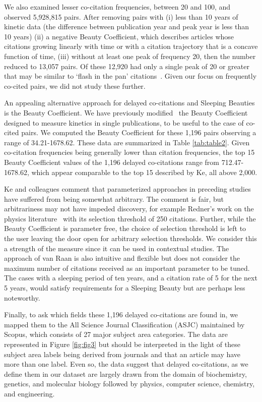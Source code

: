 \documentclass[11pt, oneside]{article}   	%
\begin{document}
We also examined lesser co-citation frequencies, between 20 and 100, and observed 5,928,815 pairs. After removing pairs with (i) less than 10 years of kinetic data (the difference between publication year and peak year is less than 10 years) (ii) a negative Beauty Coefficient, which describes articles whose citations growing linearly with time or with a citation trajectory that is a concave function of time, (iii) without at least one peak of frequency 20, then the number reduced to 13,057 pairs. Of these 12,920 had only a single peak of 20 or greater that may be similar to `flash in the pan' citations~\citep{Li2013CitationCO,ye_bornmann_2018}. Given our focus on frequently co-cited pairs, we did not study these further.

An appealing alternative approach for delayed co-citations and Sleeping Beauties is the Beauty Coefficient. We have previously modified~\citep{devarakonda_2020}  the Beauty Coefficient~\citep{Ke2015} designed to measure kinetics in single publications, to be useful to the case of co-cited pairs. We computed the Beauty Coefficient for these 1,196 pairs observing a range of 34.21-1678.62. These data are summarized in Table \ref{tab:table2}.  Given co-citation frequencies being generally lower than citation frequencies, the top 15 Beauty Coefficient values of the 1,196 delayed co-citations range from 712.47-1678.62, which appear comparable to the top 15 described by Ke, all above 2,000.

Ke and colleagues comment that parameterized approaches in preceding studies have suffered from being somewhat arbitrary. The comment is fair, but arbitrariness may not have impeded discovery, for example Redner's work on the physics literature~\citep{redner_2005} with its selection threshold of 250 citations. Further, while the Beauty Coefficient is parameter free, the choice of selection threshold is left to the user leaving the door open for arbitrary selection thresholds. We consider this a strength of the measure since it can be used in contextual studies. The approach of van Raan is also intuitive and flexible but does not consider the maximum number of citations received as an important parameter to be tuned.  The cases with a sleeping period of ten years, and a citation rate of 5 for the next 5 years, would satisfy requirements for a Sleeping Beauty but are perhaps less noteworthy.

Finally, to ask which fields these 1,196 delayed co-citations are found in, we mapped them to the All Science Journal Classification (ASJC) maintained by Scopus, which consists of 27 major subject area categories.  The data are represented in Figure \ref{fig:fig3} but should be interpreted in the light of these subject area labels being derived from journals and that an article may have more than one label. Even so, the data suggest that delayed co-citations, as we define them in our dataset are largely drawn from the domain of biochemistry, genetics, and molecular biology followed by physics, computer science, chemistry, and engineering. 
\end{document}
